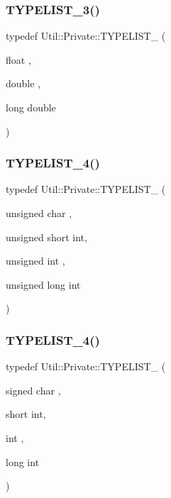 \mbox{\label{namespaceUtil_1_1Private_a0b98bef9e8fd094726b49ae3ea04d81d}} 
\subsubsection{\texorpdfstring{TYPELIST\_3()}{TYPELIST\_3()}\hspace{0.1cm}{\footnotesize\ttfamily [2/2]}}
{\footnotesize\ttfamily typedef Util\+::\+Private\+::\+T\+Y\+P\+E\+L\+I\+S\+T\+\_ (\begin{DoxyParamCaption}\item[{float}]{,  }\item[{double}]{,  }\item[{long}]{double }\end{DoxyParamCaption})}

\mbox{\label{namespaceUtil_1_1Private_aa81b02b7963e37c42096312fa70d0791}} 
\subsubsection{\texorpdfstring{TYPELIST\_4()}{TYPELIST\_4()}\hspace{0.1cm}{\footnotesize\ttfamily [1/2]}}
{\footnotesize\ttfamily typedef Util\+::\+Private\+::\+T\+Y\+P\+E\+L\+I\+S\+T\+\_ (\begin{DoxyParamCaption}\item[{unsigned char}]{,  }\item[{unsigned short}]{int,  }\item[{unsigned int}]{,  }\item[{unsigned long}]{int }\end{DoxyParamCaption})}

\mbox{\label{namespaceUtil_1_1Private_a19b1c2e5f4b1c1a580f117d4ca819b3e}} 
\subsubsection{\texorpdfstring{TYPELIST\_4()}{TYPELIST\_4()}\hspace{0.1cm}{\footnotesize\ttfamily [2/2]}}
{\footnotesize\ttfamily typedef Util\+::\+Private\+::\+T\+Y\+P\+E\+L\+I\+S\+T\+\_ (\begin{DoxyParamCaption}\item[{signed char}]{,  }\item[{short}]{int,  }\item[{int}]{,  }\item[{long}]{int }\end{DoxyParamCaption})}



